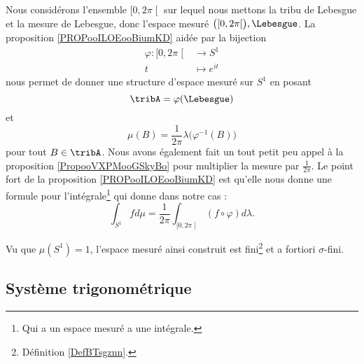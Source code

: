 \begin{normaltext}
    Nous considérons l'ensemble \( \mathopen[ 0 , 2\pi \mathclose[\) sur lequel nous mettons la tribu de Lebesgue et la mesure de Lebesgue, donc l'espace mesuré \( \big( \mathopen[ 0 , 2\pi \mathclose[ \big), \Lebesgue\). La proposition \ref{PROPooILOEooBiumKD} aidée par la bijection
        \begin{equation}
            \begin{aligned}
                \varphi\colon \mathopen[ 0 , 2\pi \mathclose[&\to S^1 \\
                    t&\mapsto  e^{it} 
            \end{aligned}
        \end{equation}
        nous permet de donner une structure d'espace mesuré sur \( S^1\) en posant
        \begin{equation}
            \tribA=\varphi(\Lebesgue)
        \end{equation}
        et
        \begin{equation}        \label{EQooOEVDooSYWrgT}
            \mu(B)=\frac{1}{ 2\pi }\lambda\big( \varphi^{-1}(B) \big)
        \end{equation}
        pour tout \( B\in \tribA\). Nous avons également fait un tout petit peu appel à la proposition \ref{PropooVXPMooGSkyBo} pour multiplier la mesure par \( \frac{1}{ 2\pi }\). Le point fort de la proposition \ref{PROPooILOEooBiumKD} est qu'elle nous donne une formule pour l'intégrale\footnote{Qui a un espace mesuré a une intégrale.} qui donne dans notre cas :
        \begin{equation}        \label{EQooCFPAooMcrDEQ}
            \int_{S^1}fd\mu=\frac{1}{ 2\pi }\int_{\mathopen[ 0 , 2\pi \mathclose[}(f\circ\varphi)d\lambda.            
        \end{equation}
\end{normaltext}

Vu que \( \mu(S^1)=1\), l'espace mesuré ainsi construit est fini\footnote{Définition \ref{DefBTsgznn}.} et a fortiori \( \sigma\)-fini.

\subsection{Système trigonométrique}

